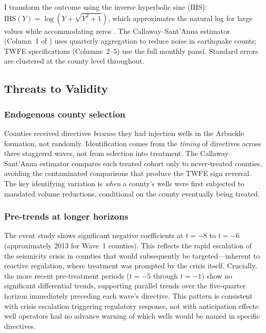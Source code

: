 \documentclass[12pt]{article}
\begin{document}
I transform the outcome using the inverse hyperbolic sine (IHS): $\text{IHS}(Y) = \log(Y + \sqrt{Y^2 + 1})$, which approximates the natural log for large values while accommodating zeros \citep{bellemare2020elasticities}. The Callaway--Sant'Anna estimator (Column~1 of ) uses quarterly aggregation to reduce noise in earthquake counts; TWFE specifications (Columns~2--5) use the full monthly panel. Standard errors are clustered at the county level throughout.

\subsection{Threats to Validity}

\subsubsection*{Endogenous county selection} Counties received directives \textit{because} they had injection wells in the Arbuckle formation, not randomly. Identification comes from the \textit{timing} of directives across three staggered waves, not from selection into treatment. The Callaway--Sant'Anna estimator compares each treated cohort only to never-treated counties, avoiding the contaminated comparisons that produce the TWFE sign reversal. The key identifying variation is \textit{when} a county's wells were first subjected to mandated volume reductions, conditional on the county eventually being treated.

\subsubsection*{Pre-trends at longer horizons} The event study shows significant negative coefficients at $t = -8$ to $t = -6$ (approximately 2013 for Wave~1 counties). This reflects the rapid escalation of the seismicity crisis in counties that would subsequently be targeted---inherent to reactive regulation, where treatment was prompted by the crisis itself. Crucially, the more recent pre-treatment periods ($t = -5$ through $t = -1$) show no significant differential trends, supporting parallel trends over the five-quarter horizon immediately preceding each wave's directive. This pattern is consistent with crisis escalation triggering regulatory response, not with anticipation effects: well operators had no advance warning of which wells would be named in specific directives.
\end{document}
